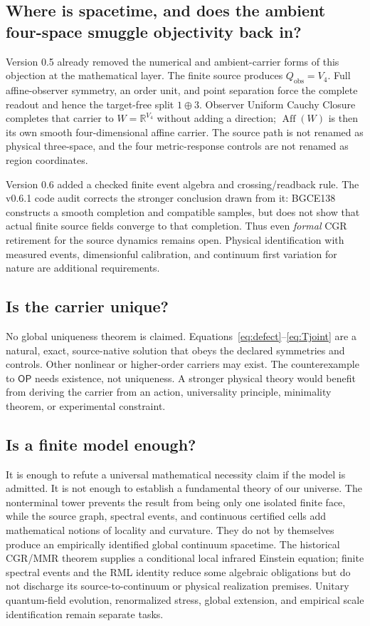 \documentclass[11pt]{article}
\theoremstyle{definition}
\theoremstyle{remark}
\newcommand{\OPT}{\mathsf{OP}}
\begin{document}
\subsection{Where is spacetime, and does the ambient four-space smuggle objectivity back in?}

Version 0.5 already removed the numerical and ambient-carrier forms of this objection at the mathematical layer. The finite source produces $Q_{\mathrm{obs}}=V_4$. Full affine-observer symmetry, an order unit, and point separation force the complete readout and hence the target-free split $1\oplus3$. Observer Uniform Cauchy Closure completes that carrier to $W=\mathbb R^{V_4}$ without adding a direction; $\operatorname{Aff}(W)$ is then its own smooth four-dimensional affine carrier. The source path is not renamed as physical three-space, and the four metric-response controls are not renamed as region coordinates.

Version 0.6 added a checked finite event algebra and crossing/readback rule. The v0.6.1 code audit corrects the stronger conclusion drawn from it: BGCE138 constructs a smooth completion and compatible samples, but does not show that actual finite source fields converge to that completion. Thus even \emph{formal} CGR retirement for the source dynamics remains open. Physical identification with measured events, dimensionful calibration, and continuum first variation for nature are additional requirements.

\subsection{Is the carrier unique?}

No global uniqueness theorem is claimed. Equations~\eqref{eq:defect}--\eqref{eq:Tjoint} are a natural, exact, source-native solution that obeys the declared symmetries and controls. Other nonlinear or higher-order carriers may exist. The counterexample to $\OPT$ needs existence, not uniqueness. A stronger physical theory would benefit from deriving the carrier from an action, universality principle, minimality theorem, or experimental constraint.

\subsection{Is a finite model enough?}

It is enough to refute a universal mathematical necessity claim if the model is admitted. It is not enough to establish a fundamental theory of our universe. The nonterminal tower prevents the result from being only one isolated finite face, while the source graph, spectral events, and continuous certified cells add mathematical notions of locality and curvature. They do not by themselves produce an empirically identified global continuum spacetime. The historical CGR/MMR theorem supplies a conditional local infrared Einstein equation; finite spectral events and the RML identity reduce some algebraic obligations but do not discharge its source-to-continuum or physical realization premises. Unitary quantum-field evolution, renormalized stress, global extension, and empirical scale identification remain separate tasks.
\end{document}

